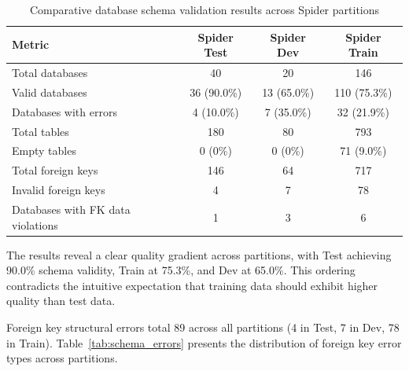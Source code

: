 \documentclass[]{einformatica}
\begin{document}
\begin{table}[ht]
    \caption{Comparative database schema validation results across Spider partitions}
    \label{tab:schema_overall}
    \centering
    \footnotesize
    \begin{tabular}{lccc}
        \toprule
        \textbf{Metric} & \textbf{Spider Test} & \textbf{Spider Dev} & \textbf{Spider Train} \\
        \midrule
        Total databases & 40 & 20 & 146 \\
        Valid databases & 36 (90.0\%) & 13 (65.0\%) & 110 (75.3\%) \\
        Databases with errors & 4 (10.0\%) & 7 (35.0\%) & 32 (21.9\%) \\
        Total tables & 180 & 80 & 793 \\
        Empty tables & 0 (0\%) & 0 (0\%) & 71 (9.0\%) \\
        Total foreign keys & 146 & 64 & 717 \\
        Invalid foreign keys & 4 & 7 & 78 \\
        Databases with FK data violations & 1 & 3 & 6 \\
        \bottomrule
    \end{tabular}
\end{table}

The results reveal a clear quality gradient across partitions, with Test achieving 90.0\% schema validity, Train at 75.3\%, and Dev at 65.0\%. This ordering contradicts the intuitive expectation that training data should exhibit higher quality than test data.

Foreign key structural errors total 89 across all partitions (4 in Test, 7 in Dev, 78 in Train). Table~\ref{tab:schema_errors} presents the distribution of foreign key error types across partitions.
\end{document}
